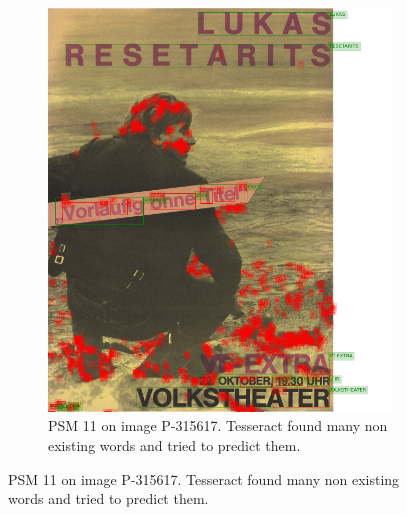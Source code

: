 \begin{figure}[hbtp!]
    \begin{subfigure}{\textwidth}
        \centering
        \includegraphics[scale=0.29]{obrazky/plakaty/result_tesseract_vienna2_nosplit_psm11-83.png}
        \caption{PSM 11 on image P-315617. Tesseract found many non existing words and tried to predict them.}
        \label{Im4:ex:tess11}
    \end{subfigure}


\end{figure}
